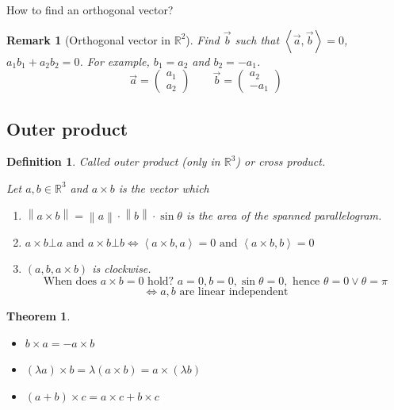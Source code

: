\documentclass{article}
\newcounter{lecref}[section]
\numberwithin{lecref}{section}
\newtheorem{theorem}[lecref]{Theorem}
\newtheorem{definition}[lecref]{Definition}
\newtheorem{remark}[lecref]{Remark}
\newcommand{\angel}[1]{\left\langle#1\right\rangle}
\newcommand{\norm}[1]{\left\|#1\right\|}
\newcommand{\rh}[1]{\vec{#1}}
\begin{document}
How to find an orthogonal vector?

\begin{remark}[Orthogonal vector in $\mathbb R^2$]
  Find $\vec{b}$ such that $\angel{\rh{a}, \rh{b}} = 0$, $a_1 b_1 + a_2 b_2 = 0$. For example, $b_1 = a_2$ and $b_2 = -a_1$.
  \[ \rh{a} = \begin{pmatrix} a_1 \\ a_2 \end{pmatrix} \qquad \rh{b} = \begin{pmatrix} a_2 \\ -a_1 \end{pmatrix} \]
\end{remark}

\subsection{Outer product}

\begin{definition} %
  Called \emph{outer product} (only in $\mathbb R^3$) or \emph{cross product}.

  Let $a,b \in \mathbb R^3$ and $a \times b$ is the vector which
  \begin{enumerate}
    \item $\norm{a \times b} = \norm{a} \cdot \norm{b} \cdot \sin{\theta}$ is the area of the spanned parallelogram.
    \item $a \times b \bot a \text{ and } a \times b \bot b
      \iff \angel{a \times b, a} = 0 \text{ and } \angel{a \times b, b} = 0$
    \item $(a, b, a \times b)$ is clockwise.
      \[ \text{When does } a \times b = 0 \text{ hold? } a = 0, b = 0, \sin\theta = 0, \text{ hence } \theta = 0 \lor \theta = \pi \]
      \[ \iff a,b \text{ are linear independent} \]
  \end{enumerate}
\end{definition}

\begin{theorem}
  \begin{itemize}
    \item $b \times a = -a \times b$
    \item $(\lambda a) \times b = \lambda (a \times b) = a \times (\lambda b)$
    \item $(a + b) \times c = a \times c + b \times c$
  \end{itemize}
\end{theorem}
\end{document}
